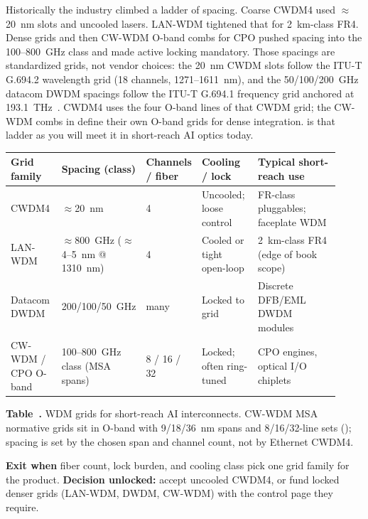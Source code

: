 Historically the industry climbed a ladder of spacing. Coarse CWDM4 used
$\approx$20~nm slots and uncooled lasers. LAN-WDM tightened that for 2~km-class
FR4. Dense grids and then CW-WDM O-band combs for CPO pushed spacing into the
100--800~GHz class and made active locking mandatory. Those spacings are
standardized grids, not vendor choices: the 20~nm CWDM slots follow the ITU-T
G.694.2 wavelength grid (18 channels, 1271--1611~nm), and the 50/100/200~GHz
datacom DWDM spacings follow the ITU-T G.694.1 frequency grid anchored at
193.1~THz~. CWDM4 uses the four O-band lines of that CWDM
grid; the CW-WDM combs in  define their own O-band grids for
dense integration.  is that ladder as you will meet it in
short-reach AI optics today.

\begin{table}[ht]
\label{tab:wdm-grids}%
\centering
\setlength{\tabcolsep}{3.5pt}%
\footnotesize
\renewcommand{\arraystretch}{1.25}%
\begin{tabular}{@{}p{0.16\linewidth}p{0.14\linewidth}p{0.12\linewidth}p{0.18\linewidth}p{0.32\linewidth}@{}}
\toprule
Grid family & Spacing (class) & Channels / fiber & Cooling / lock & Typical short-reach use \\
\midrule
CWDM4 & $\approx$20~nm & 4 & Uncooled; loose control & FR-class pluggables; faceplate WDM \\
\addlinespace[1.5em]
LAN-WDM & $\approx$800~GHz ($\approx$4--5~nm @ 1310~nm) & 4 & Cooled or tight open-loop & 2~km-class FR4 (edge of book scope) \\
\addlinespace[1.5em]
Datacom DWDM & 200/100/50~GHz & many & Locked to grid & Discrete DFB/EML DWDM modules \\
\addlinespace[1.5em]
CW-WDM / CPO O-band & 100--800~GHz class (MSA spans) & 8 / 16 / 32 & Locked; often ring-tuned & CPO engines, optical I/O chiplets \\
\bottomrule
\end{tabular}
\par\medskip
{\raggedright\footnotesize\textbf{Table~\thetable.} WDM grids for short-reach AI interconnects.
CW-WDM MSA normative grids sit in O-band with 9/18/36~nm spans and 8/16/32-line
sets (); spacing is set by the chosen span and channel count, not
by Ethernet CWDM4.\par}
\end{table}

\textbf{Exit when} fiber count, lock burden, and cooling class pick one grid
family for the product. \textbf{Decision unlocked:} accept uncooled CWDM4, or
fund locked denser grids (LAN-WDM, DWDM, CW-WDM) with the control page they
require.

